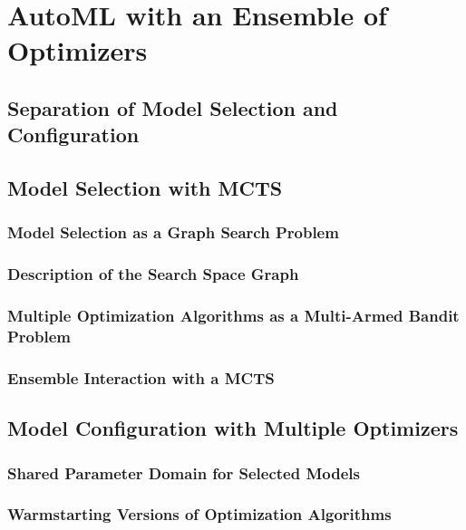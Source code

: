 %
\chapter{AutoML with an Ensemble of Optimizers}
\label{sec:approach}

\Blindtext

\section{Separation of Model Selection and Configuration}
\label{sec:approach:separation}

\Blindtext

\section{Model Selection with MCTS}
\label{sec:approach:selection}

\Blindtext

\subsection{Model Selection as a Graph Search Problem}
\label{sec:appraoch:selection:search}

\Blindtext

\subsection{Description of the Search Space Graph}
\label{sec:appraoch:selection:graph}

\Blindtext

\subsection{Multiple Optimization Algorithms as a Multi-Armed Bandit Problem}
\label{sec:appraoch:selection:bandit}

\Blindtext

\subsection{Ensemble Interaction with a MCTS}
\label{sec:appraoch:selection:mcts}

\Blindtext

\section{Model Configuration with Multiple Optimizers}
\label{sec:approach:configuration}

\Blindtext

\subsection{Shared Parameter Domain for Selected Models}
\label{sec:appraoch:configuration:parameter}

\Blindtext

\subsection{Warmstarting Versions of Optimization Algorithms}
\label{sec:appraoch:configuration:warmstart}

\Blindtext